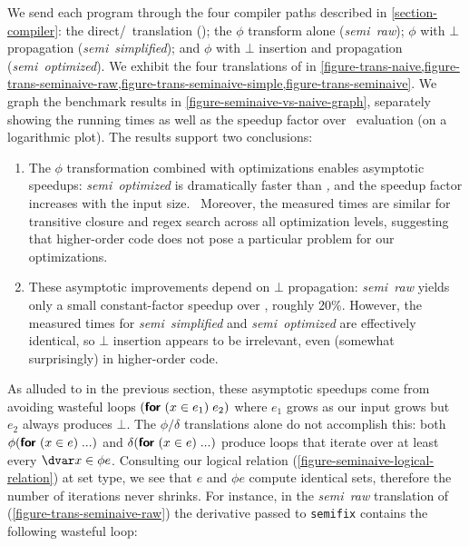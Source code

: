 \noindent
We send each program through the four compiler paths described in \cref{section-compiler}: the direct/\naive\ translation (\emph{\naive}); the $\phi$ transform alone (\emph{semi\naive\ raw}); $\phi$ with $\bot$ propagation (\emph{semi\naive\ simplified}); and $\phi$ with $\bot$ insertion and propagation (\emph{semi\naive\ optimized}).
%
We exhibit the four translations of  in \cref{figure-trans-naive,figure-trans-seminaive-raw,figure-trans-seminaive-simple,figure-trans-seminaive}. We graph the benchmark results in \cref{figure-seminaive-vs-naive-graph}, separately showing the running times as well as the speedup factor over \naive\ evaluation (on a logarithmic plot).
%
The results support two conclusions:

\begin{enumerate}
\item The $\phi$ transformation combined with optimizations enables asymptotic
  speedups: \emph{semi\naive\ optimized} is dramatically faster than
  \emph{\naive,} and the speedup factor increases with the input size.\footnotemark\
%
  Moreover, the measured times are similar for transitive closure and regex
  search across all optimization levels, suggesting that higher-order code does
  not pose a particular problem for our optimizations.


\item These asymptotic improvements depend on $\bot$ propagation:
  \emph{semi\naive\ raw} yields only a small constant-factor speedup over
  \emph{\naive}, roughly 20\%.
%
  However, the measured times for \emph{semi\naive\ simplified} and
  \emph{semi\naive\ optimized} are effectively identical, so $\bot$ insertion
  appears to be irrelevant, even (somewhat surprisingly) in higher-order code.
\end{enumerate}

\noindent
As alluded to in the previous section, these asymptotic speedups come
from avoiding wasteful loops $(\textsf{\bfseries for}_{}\;({{x} \in e_1})\; e_2)$ where $e_1$ grows as our input grows but $e_2$ always produces $\bot$.
%
The $\phi/\delta$ translations alone do not accomplish this: both $\phi(\textsf{\bfseries for}_{}\;({{x} \in e})\; ...)$ and $\delta(\textsf{\bfseries for}_{}\;({{x} \in e})\; ...)$ produce loops that iterate over at least
every $\dvar x \in \phi e$.
%
Consulting our logical relation (\cref{figure-seminaive-logical-relation}) at
set type, we see that $e$ and $\phi e$ compute identical sets, therefore
the number of iterations never shrinks.
%
For instance, in the \emph{semi\naive\ raw} translation of  (\cref{figure-trans-seminaive-raw}) the derivative passed to \lstinline{semifix} contains the following wasteful loop:

